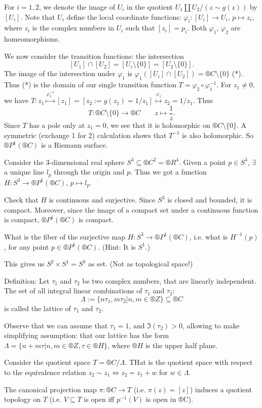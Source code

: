 \documentclass[12pt]{article}					%
\begin{document}
\begin{poznamka}
	For $i = 1, 2$, we denote the image of $U_i$ in the quotient $U_1 \coprod U_2 / (z \sim g(z))$ by $[U_i]$. Note that $U_i$ define the local coordinate functions: $φ_i: [U_i] \rightarrow U_i$, $p \mapsto z_i$, where $z_i$ is the complex numbers in $U_i$ such that $[z_i] = p_i$. Both $φ_1$, $φ_2$ are homeomorphisms.

	We now consider the transition functions: the intersection
	$$ [U_1] \cap [U_2] = [U_i \setminus \{0\}] = [U_2 \setminus \{0\}]. $$
	The image of the intersection under $φ_1$ is $φ_1([U_i] \cap [U_2]) = ®C \setminus \{0\}$ (*). Thus (*) is the domain of our single transition function $T = φ_2 ∘ φ_1^{-1}$. For $z_1 ≠ 0$, we have $T: z_1 \overset{φ_1^{-1}}\mapsto [z_1] = [z_2 := g(z_1) = 1 / z_1] \overset{φ_1}\mapsto z_2 = 1 / z_1$. Thus
	$$ T: ®C \setminus \{0\} \rightarrow ®C \qquad z \mapsto \frac{1}{z}. $$
	Since $T$ has a pole only at $z_1 = 0$, we see that it is holomorphic on $®C \setminus \{0\}$. A symmetric (exchange 1 for 2) calculation shows that $T^{-1}$ is also holomorphic. So $®P^1(®C)$ is a Riemann surface.
\end{poznamka}

\begin{priklad}
	Consider the 3-dimensional real sphere $S^3 \subseteq ®C^2 = ®R^4$. Given a point $p \in S^3$, $\exists$ a unique line $l_p$ through the origin and $p$. Thus we got a function $H: S^3 \rightarrow ®P^1(®C)$, $p \mapsto l_p$.

	Check that $H$ is continuous and surjective. Since $S^3$ is closed and bounded, it is compact. Moreover, since the image of a compact set under a continuous function is compact, $®P^1(®C)$ is compact.

	What is the fiber of the surjective map $H: S^3 \rightarrow ®P^1(®C)$, i.e. what is $H^{-1}(p)$, for any point $p \in ®P^1(®C)$. (Hint: It is $S^1$.)

	This gives us $S^2 \times S^1 = S^3$ as set. (Not as topological space!)
\end{priklad}

\begin{priklad}
	Definition: Let $τ_1$ and $τ_2$ be two complex numbers, that are linearly independent. The set of all integral linear combinations of $τ_1$ and $τ_2$:
	$$ Λ := \{nτ_1, mτ_2 | n,m \in ®Z\} \subseteq ®C $$
	is called the lattice of $τ_1$ and $τ_2$.

	Observe that we can assume that $τ_1 = 1$, and $\Im(τ_2) > 0$, allowing to make simplifying assumption: that our lattice has the form $Λ = \{n + mτ | n, m \in ®Z, τ \in ®H\}$, where $®H$ is the upper half plane.

	Consider the quotient space $T = ®C / Λ$. THat is the quotient space with respect to the equivalence relation $z_2 \sim z_1 \Leftrightarrow z_2 = z_1 + w$ for $w \in Λ$.

	The canonical projection map $π: ®C \rightarrow T$ (i.e. $π(z) = [z]$) induces a quotient topology on $T$ (i.e. $V \subseteq T$ is open iff $p^{-1}(V)$ is open in ®C).
\end{priklad}
\end{document}
